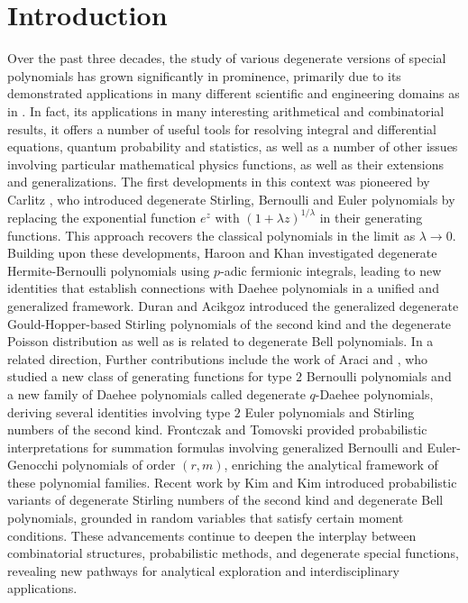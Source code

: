 \documentclass{birkjour}
\theoremstyle{definition}
\theoremstyle{remark}
\numberwithin{equation}{section}
\begin{document}
\section{Introduction}
Over the past three decades, the study of various degenerate
versions of special polynomials has grown significantly in
prominence, primarily due to its demonstrated applications in many
different scientific and engineering domains as in
\cite{[a80],[d91],[jk19],[k97],[kaa24],[kaaa21],[kk18],[kk23],[kkkl20],
[kss97],[kss19],[kswy98],[ltdy24],[rare25]}.
In fact, its applications in many interesting arithmetical and
combinatorial results, it offers a number of useful tools for
resolving integral and differential equations, quantum probability
and statistics, as well as a number of other issues involving
particular mathematical physics functions, as well as their
extensions and generalizations. The first developments in this
context was pioneered by Carlitz \cite{[c79]}, who introduced
degenerate Stirling, Bernoulli and Euler polynomials by replacing
the exponential function $e^z$ with $(1+\lambda z)^{1/\lambda}$ in
their generating functions. This approach recovers the classical
polynomials in the limit as $\lambda \to 0$. Building upon these
developments, Haroon and Khan \cite{[hk18]} investigated degenerate
Hermite-Bernoulli polynomials using $p$-adic fermionic integrals,
leading to new identities that establish connections with Daehee
polynomials in a unified and generalized framework. Duran and
Acikgoz \cite{[da20],[da20b]} introduced the generalized degenerate
Gould-Hopper-based Stirling polynomials of the second kind and the
degenerate Poisson distribution as well as is related to degenerate
Bell polynomials. In a related direction, Further contributions
include the work of Araci \cite{[a21]} and \cite{[a21b]}, who
studied a new class of generating functions for type $2$ Bernoulli
polynomials and a new family of Daehee polynomials called degenerate
$q$-Daehee polynomials, deriving several identities involving type
$2$ Euler polynomials and Stirling numbers of the second kind.
Frontczak and Tomovski \cite{[ft22]} provided probabilistic
interpretations for summation formulas involving generalized
Bernoulli and Euler-Genocchi polynomials of order $(r, m)$,
enriching the analytical framework of these polynomial families.
Recent work by Kim and Kim \cite{[kk23]} introduced probabilistic
variants of degenerate Stirling numbers of the second kind and
degenerate Bell polynomials, grounded in random variables that
satisfy certain moment conditions. These advancements continue to
deepen the interplay between combinatorial structures, probabilistic
methods, and degenerate special functions, revealing new pathways
for analytical exploration and interdisciplinary applications.
\end{document}
